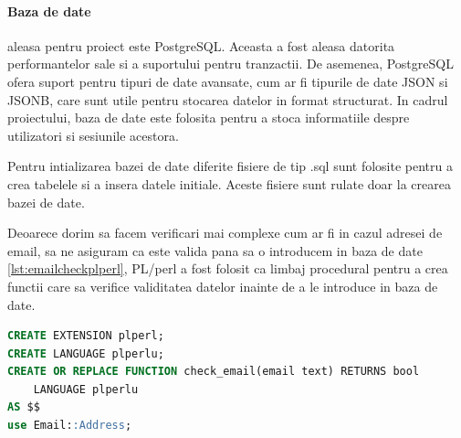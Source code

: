 \documentclass[titlepage,12pt]{article}
\DeclareRobustCommand{\code}[1]{{\ttfamily\small #1}}
\begin{document}
\paragraph{Baza de date} aleasa pentru proiect este \code{PostgreSQL}. Aceasta a fost aleasa datorita performantelor sale si a suportului pentru tranzactii. De asemenea, PostgreSQL ofera suport pentru tipuri de date avansate, cum ar fi tipurile de date JSON si JSONB, care sunt utile pentru stocarea datelor in format structurat. In cadrul proiectului, baza de date este folosita pentru a stoca informatiile despre utilizatori si sesiunile acestora.

Pentru intializarea bazei de date diferite fisiere de tip \code{.sql} sunt folosite pentru a crea tabelele si a insera datele initiale. Aceste fisiere sunt rulate doar la crearea bazei de date.

Deoarece dorim sa facem verificari mai complexe cum ar fi in cazul adresei de email, sa ne asiguram ca este valida pana sa o introducem in baza de date \cref{lst:emailcheckplperl}, \code{PL/perl} a fost folosit ca limbaj procedural pentru a crea functii care sa verifice validitatea datelor inainte de a le introduce in baza de date.

\begin{lstlisting}[language=SQL,caption={Functia PL/perl pentru verificarea adresei de email},label={lst:emailcheckplperl}]
CREATE EXTENSION plperl;
CREATE LANGUAGE plperlu;
CREATE OR REPLACE FUNCTION check_email(email text) RETURNS bool
    LANGUAGE plperlu
AS $$
use Email::Address;
\end{lstlisting}
\end{document}
